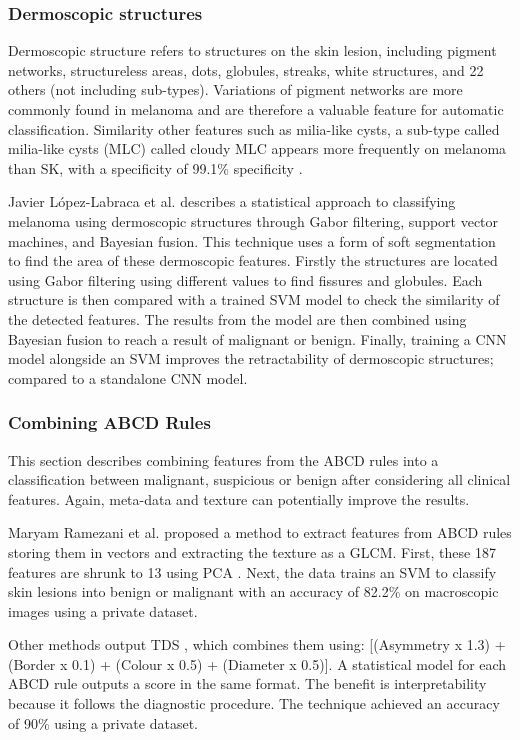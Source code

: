 \documentclass[10.5pt]{report}
\begin{document}
\subsubsection{Dermoscopic structures}
Dermoscopic structure refers to structures on the skin lesion, including pigment networks, structureless areas, dots, globules, streaks, white structures, and 22 others (not including sub-types). Variations of pigment networks are more commonly found in melanoma \cite{Anantha04} and are therefore a valuable feature for automatic classification. Similarity other features such as milia-like cysts, a sub-type called milia-like cysts (MLC) called cloudy MLC appears more frequently on melanoma than SK, with a specificity of  99.1\% specificity \cite{Stricklin2011}.

Javier López-Labraca et al. \cite{Lopez-Labraca2018} describes a statistical approach to classifying melanoma using dermoscopic structures through Gabor filtering, support vector machines, and Bayesian fusion. This technique uses a form of soft segmentation to find the area of these dermoscopic features. Firstly the structures are located using Gabor filtering using different values to find fissures and globules. Each structure is then compared with a trained SVM model to check the similarity of the detected features. The results from the model are then combined using Bayesian fusion to reach a result of malignant or benign. Finally, training a CNN model alongside an SVM improves the retractability of dermoscopic structures; compared to a standalone CNN model.

\subsubsection{Combining ABCD Rules}
This section describes combining features from the ABCD rules into a classification between malignant, suspicious or benign after considering all clinical features. Again, meta-data and texture can potentially improve the results.

Maryam Ramezani et al. proposed a method to extract features from ABCD rules storing them in vectors and extracting the texture as a GLCM. First, these 187 features are shrunk to 13 using PCA \cite{Ramezani2014}. Next, the data trains an SVM to classify skin lesions into benign or malignant with an accuracy of 82.2\% on macroscopic images using a private dataset.

Other methods output TDS \cite{Zaqout2016, Zhang2018}, which combines them using: [(Asymmetry x 1.3) + (Border x 0.1) + (Colour x 0.5) + (Diameter x 0.5)]. A statistical model for each ABCD rule outputs a score in the same format. The benefit is interpretability because it follows the diagnostic procedure. The technique achieved an accuracy of 90\% using a private dataset.
\end{document}
